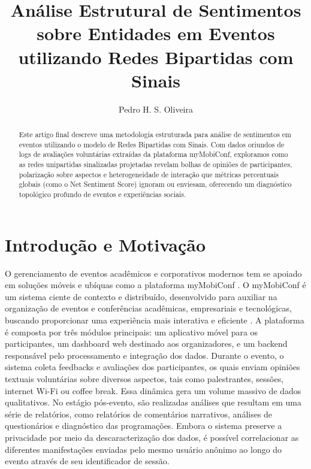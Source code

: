 \documentclass[sigconf]{webmedia}
\begin{document}
\title{Análise Estrutural de Sentimentos sobre Entidades em Eventos utilizando Redes Bipartidas com Sinais}

\author{Pedro H. S. Oliveira}

\renewcommand{\shortauthors}{Oliveira, P. H. S.}

\begin{abstract}
Este artigo final descreve uma metodologia estruturada para análise de sentimentos em eventos utilizando o modelo de Redes Bipartidas com Sinais. Com dados oriundos de logs de avaliações voluntárias extraídas da plataforma myMobiConf, exploramos como as redes unipartidas sinalizadas projetadas revelam bolhas de opiniões de participantes, polarização sobre aspectos e heterogeneidade de interação que métricas percentuais globais (como o Net Sentiment Score) ignoram ou enviesam, oferecendo um diagnóstico topológico profundo de eventos e experiências sociais.
\end{abstract}


\maketitle

\section{Introdução e Motivação}

O gerenciamento de eventos acadêmicos e corporativos modernos tem se apoiado em soluções móveis e ubíquas como a plataforma myMobiConf \cite{oliveira}. O myMobiConf é um sistema ciente de contexto e distribuído, desenvolvido para auxiliar na organização de eventos e conferências acadêmicas, empresariais e tecnológicas, buscando proporcionar uma experiência mais interativa e eficiente \cite{peixoto2026}. A plataforma é composta por três módulos principais: um aplicativo móvel para os participantes, um dashboard web destinado aos organizadores, e um backend responsável pelo processamento e integração dos dados. Durante o evento, o sistema coleta feedbacks e avaliações dos participantes, os quais enviam opiniões textuais voluntárias sobre diversos aspectos, tais como palestrantes, sessões, internet Wi-Fi ou coffee break. Essa dinâmica gera um volume massivo de dados qualitativos. No estágio pós-evento, são realizadas análises que resultam em uma série de relatórios, como relatórios de comentários narrativos, análises de questionários e diagnóstico das programações. Embora o sistema preserve a privacidade por meio da descaracterização dos dados, é possível correlacionar as diferentes manifestações enviadas pelo mesmo usuário anônimo ao longo do evento através de seu identificador de sessão.
\end{document}
